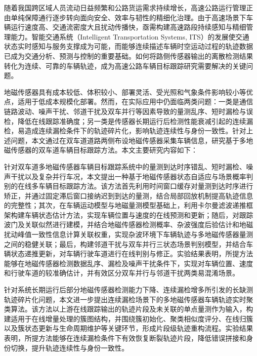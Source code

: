 随着我国跨区域人员流动日益频繁和公路货运需求持续增长，高速公路运行管理正由单纯保障通行逐步转向面向安全、效率与韧性的精细化治理。由于高速场景下车辆运行速度高、交通流密度大且扰动传播快，亟需构建高速路段持续感知与精细管理能力。智能交通系统（Intelligent Transportation Systems, ITS）的发展使交通状态实时感知与服务支撑成为可能，而能够连续描述车辆时空运动过程的轨迹数据已成为交通分析、预测与控制的重要基础。如何将路侧传感器输出的离散检测结果转化为连续、可靠的车辆轨迹，成为高速公路车辆目标跟踪研究需要解决的关键问题。

地磁传感器具有成本较低、体积较小、部署灵活、受光照和气象条件影响较小等优点，适用于低成本规模化部署。然而，在实际应用中仍面临两类问题：一类是通信链路波动、噪声干扰、邻道干扰及双车并行等因素导致的量测乱序、短时漏检与误检，降低在线跟踪准确度；另一类是传感器长期运行后检测性能衰减引起的连续漏检，易造成连续漏检条件下的轨迹碎片化，影响轨迹连续性与身份一致性。针对上述问题，本文通过在双车道道路两侧布设地磁传感器采集车辆信息，研究基于多地磁传感器的双车道车辆目标跟踪方法。本文主要研究内容如下：

针对双车道多地磁传感器车辆目标跟踪系统中的量测到达时序错乱、短时漏检、噪声干扰以及复杂并行车况，本文提出一种基于地磁传感器状态自适应与场景概率判别的在线多车辆目标跟踪方法。该方法首先利用时间窗口缓存对量测到达时序进行矫正，并通过固定滞后窗口接纳迟到到达的量测，结合局部回放机制提高轨迹信息的完整性；其次，在车辆运动模型与地磁量测模型基础上，利用卡尔曼滤波递推框架构建车辆状态估计方法，实现车辆位置与速度的在线预测和更新；随后，对跟踪波门及关联似然进行建模，并结合地磁传感器检测概率、杂波强度后验估计和地磁扰动峰值一致性信息计算关联权重，实现杂波环境下车辆轨迹与多地磁传感器量测之间的稳健关联；最后，构建邻道干扰与双车并行三状态场景判别模型，并结合车辆状态递推更新，对车辆行驶车道进行在线判别与修正。实验结果表明，所提方法能够在地磁传感器检测数据乱序、漏检及噪声干扰条件下，实现对车辆位置、速度和行驶车道的较准确估计，并有效区分双车并行与邻道干扰两类易混淆场景。

针对系统长期运行后部分地磁传感器检测能力下降、连续漏检增多所引发的长缺测轨迹碎片化问题，本文进一步提出连续漏检场景下的多地磁传感器车辆轨迹实时聚类算法。该方法以上游在线跟踪输出的轨迹片段及未关联的单点量测作为输入，构建适用于在线增量处理的簇图结构，并围绕簇初始化、聚类相似度评分、在线归簇以及簇状态更新与生命周期维护等关键环节，形成片段级轨迹重构流程。实验结果表明，所提方法能够在连续漏检条件下有效恢复断裂轨迹片段，降低错误拼接和身份切换，提升轨迹连续性与身份一致性。